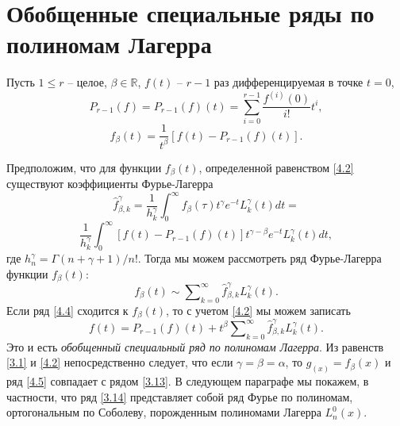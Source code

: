 \section{Обобщенные специальные ряды по полиномам Лагерра}

Пусть $1\le r$ -- целое, $\beta\in \mathbb{R}$, $f(t)$ -- $r-1$ раз дифференцируемая в точке $t=0$,
\begin{equation}\label{4.1}
  P_{r-1}(f)=P_{r-1}(f)(t)=\sum\limits_{i=0}^{r-1}\frac{f^{(i)}(0)}{i!}t^i,
\end{equation}
\begin{equation}\label{4.2}
  f_\beta(t)=\frac1{t^\beta}[f(t)-P_{r-1}(f)(t)].
\end{equation}

Предположим, что для функции $f_\beta(t)$, определенной равенством \eqref{4.2} существуют коэффициенты Фурье-Лагерра
\begin{equation*}
  \hat{f}_{\beta,k}^\gamma=\frac1{h_k^\gamma}\int_0^\infty f_\beta(\tau)t^\gamma e^{-t}L_k^\gamma(t)dt=
\end{equation*}
\begin{equation}\label{4.3}
  \frac1{h_k^\gamma}\int_0^\infty [f(t)-P_{r-1}(f)(t)]t^{\gamma-\beta}e^{-t}L_k^\gamma(t)dt,
\end{equation}
где $h_n^\gamma=\Gamma(n+\gamma+1)/n!$.
Тогда мы можем рассмотреть ряд Фурье-Лагерра функции $f_\beta(t)$:
\begin{equation}\label{4.4}
  f_\beta(t)\sim\sum\nolimits_{k=0}^\infty\hat{f}_{\beta,k}^\gamma L_k^\gamma(t).
\end{equation}
Если ряд \eqref{4.4} сходится к $f_\beta(t)$, то с учетом \eqref{4.2} мы можем записать
\begin{equation}\label{4.5}
  f(t)=P_{r-1}(f)(t)+t^\beta\sum\nolimits_{k=0}^\infty\hat{f}_{\beta,k}^\gamma L_k^\gamma(t).
\end{equation}
 Это и есть \textit{ обобщенный специальный ряд по полиномам Лагерра}. Из равенств \eqref{3.1} и \eqref{4.2}  непосредственно следует, что  если $\gamma=\beta=\alpha$, то $g_(x)=f_\beta(x)$ и ряд \eqref{4.5} совпадает с рядом \eqref{3.13}. В следующем параграфе мы покажем, в частности, что ряд \eqref{3.14} представляет собой ряд Фурье по полиномам, ортогональным по Соболеву, порожденным полиномами Лагерра $L_n^0(x)$.





